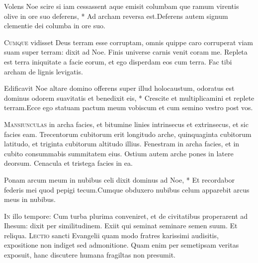 \begin{multicols*}{2}
\begin{responsory}
{Volens Noe scire si iam cessassent aque emisit columbam que ramum virentis olive in ore suo deferens, * Ad archam reversa est.}{Deferens autem signum clementie dei columba in ore suo.}
\end{responsory}
\lettrine[lines=2]{\zallmancaps \color{Blue} C}{umque} vidisset Deus terram esse corruptam, omnis quippe caro corruperat viam suam super terram: dixit ad Noe. Finis universe carnis venit coram me. Repleta est terra iniquitate a facie eorum, et ego disperdam eos cum terra. Fac tibi archam de lignis levigatis.
\begin{responsory}
{Edificavit Noe altare domino offerens super illud holocaustum, odoratus est dominus odorem suavitatis et benedixit eis, * Crescite et multiplicamini et replete terram.}{Ecce ego statuam pactum meum vobiscum et cum semino vestro post vos.}
\end{responsory}
\lettrine[lines=2]{\zallmancaps \color{Red} M}{ansiunculas} in archa facies, et bitumine linies intrinsecus et extrinsecus, et sic facies eam. Trecentorum cubitorum erit longitudo arche, quinquaginta cubitorum latitudo, et triginta cubitorum altitudo illius. Fenestram in archa facies, et in cubito consummabis summitatem eius. Ostium autem arche pones in latere deorsum. Cenacula et tristega facies in ea.
\begin{responsory-doxology}
{Ponam arcum meum in nubibus celi dixit dominus ad Noe, * Et recordabor federis mei quod pepigi tecum.}{Cumque obduxero nubibus celum apparebit arcus meus in nubibus.}
\end{responsory-doxology}
\lettrine[lines=2]{\zallmancaps \color{Blue} I}{n} illo tempore: Cum turba plurima conveniret, et de civitatibus properarent ad Ihesum: dixit per similitudinem. Exiit qui seminat seminare semen suum. Et reliqua.
\lettrine[lines=2]{\zallmancaps \color{Red} L}{ectio} sancti Evangelii quam modo fratres karissimi audisitis, expositione non indiget sed admonitione. Quam enim per semetipsam veritas exposuit, hanc discutere humana fragiltas non presumit.
\begin{responsory}

\end{responsory}
\end{multicols*}

